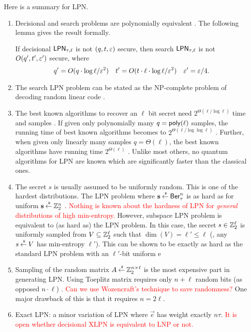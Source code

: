\noindent Here is a summary for LPN. 
\begin{enumerate}
	\item Decisional and search problems are polynomially equivalent \cite{C:BFKL93,JC:KatShiSmi10}.
	The following lemma gives the result formally.
	
	\begin{importedlemma}
		If decisional $\mathsf{LPN}_{\tau, \ell}$ is not $(q,t,\varepsilon)$ secure, then search $\mathsf{LPN}_{\tau,\ell}$ is not $O(q',t',\varepsilon')$ secure, where
		\begin{align*}
			q' = O(q\cdot \log \ell/\varepsilon^2) & & t' = O(t\cdot \ell \cdot \log \ell/\varepsilon^2) & & \varepsilon' = \varepsilon/4.
		\end{align*}
	\end{importedlemma}
	
	\item The search LPN problem can be stated as the NP-complete problem of decoding random linear code \cite{BerlMcElTilb78}.
	\item The best known algorithms to recover an $ \ell $ bit secret need $ 2^{\Theta(\ell / \log \ell)} $ time and samples \cite{STOC:BluKalWas00,Levieil06}. 
	If given only polynomially many $ q = \mathsf{poly}(\ell) $ samples, the running time of best known algorithms becomes to $ 2^{\Theta(\ell/ \log \log \ell)} $ \cite{Lyubashevsky05}.
	Further, when given only linearly many samples $ q = \Theta(\ell) $, the best known algorithms have running time $ 2^{\Theta(\ell)} $ \cite{AC:MayMeuTho11,Jacques89}. 
	Unlike most others, no quantum algorithms for LPN are known which are significantly faster than the classical ones. 
	
	\item The secret $ s $ is usually assumed to be uniformly random. 
	This is one of the hardest distributions.  
	The LPN problem where $ \mathbf{s} \mathbin{\stackrel{\mbox{\,\tiny \$}}{\gets}} \mathsf{Ber}^n_\tau $ is as hard as for uniform $ \mathbf{s} \mathbin{\stackrel{\mbox{\,\tiny \$}}{\gets}}  {\mathbb Z}^n_2 $ \cite{C:ACPS09}. 
	\textcolor{red}{Nothing is known about the hardness of LPN for \textit{general} distributions of high min-entropy.} 
	However, subspace LPN problem is equivalent to (as hard as) the LPN problem. 
	In this case, the secret $s \in {\mathbb Z}^\ell_2$ is uniformly sampled from $V \subseteq {\mathbb Z}^\ell_2$ such that $\dim(V) = \ell' \leq \ell$ (\ie, any $s \mathbin{\stackrel{\mbox{\,\tiny \$}}{\gets}} V$ has min-entropy $\ell'$).
	This can be shown to be exactly as hard as the standard LPN problem with an $\ell'$-bit uniform e
	
	\item Sampling of the random matrix $ A  \mathbin{\stackrel{\mbox{\,\tiny \$}}{\gets}} {\mathbb Z}^{n\times \ell}_2 $ is the most expensive part in generating LPN. Using Toeplitz matrix requires only $ n + \ell $ random bits (as opposed $ n \cdot \ell $) \cite{??}. \textcolor{red}{Can we use  Wozencraft's technique to save randomness?} One major drawback of this is that it requires $ n = 2 \ell $.
	\item  Exact LPN: a minor variation of LPN where $ \vec{e} $ has weight exactly $ n \tau $. \textcolor{red}{It is open whether decisional XLPN is equivalent to LNP or not.} 
\end{enumerate} 


